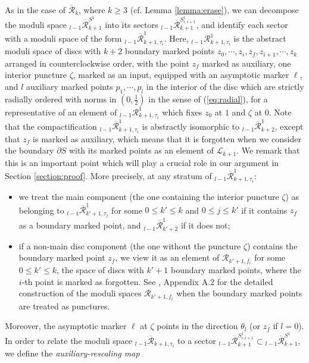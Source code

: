 \documentclass[a4paper]{article}
\numberwithin{equation}{section}
\begin{document}
As in the case of $\overline{\mathcal{R}}_k$, where $k\geq3$ (cf. Lemma \ref{lemma:erase}), we can decompose the moduli space ${}_{l-1}\overline{\mathcal{R}}_{k+1}^{S^1}$ into its sectors ${}_{l-1}\overline{\mathcal{R}}_{k+1}^{S_{i,i+1}^1}$, and identify each sector with a moduli space of the form ${}_{l-1}\overline{\mathcal{R}}_{k+1,\tau_i}^1$. Here, ${}_{l-1}\mathcal{R}_{k+1,\tau_i}^1$ is the abstract moduli space of discs with $k+2$ boundary marked points $z_0,\cdots,z_{i},z_f,z_{i+1},\cdots,z_k$ arranged in counterclockwise order, with the point $z_f$ marked as auxiliary, one interior puncture $\zeta$, marked as an input, equipped with an asymptotic marker $\ell$, and $l$ auxiliary marked points $p_1,\cdots,p_l$ in the interior of the disc which are strictly radially ordered with norms in $(0,\frac{1}{2})$ in the sense of (\ref{eq:radial}), for a representative of an element of ${}_{l-1}\mathcal{R}_{k+1,\tau_i}^1$ which fixes $z_0$ at $1$ and $\zeta$ at $0$. Note that the compactification ${}_{l-1}\overline{\mathcal{R}}_{k+1,\tau_i}^1$ is abstractly isomorphic to ${}_{l-1}\overline{\mathcal{R}}_{k+2}^1$, except that $z_f$ is marked as auxiliary, which means that it is forgotten when we consider the boundary $\partial S$ with its marked points as an element of $\mathcal{L}_{k+1}$. We remark that this is an important point which will play a crucial role in our argument in Section \ref{section:proof}. More precisely, at any stratum of ${}_{l-1}\overline{\mathcal{R}}_{k+1,\tau_i}^1$:
\begin{itemize}
	\item we treat the main component (the one containing the interior puncture $\zeta$) as belonging to ${}_{l-1}\overline{\mathcal{R}}_{k'+1,\tau_j}^1$ for some $0\leq k'\leq k$ and $0\leq j\leq k'$ if it contains $z_f$ as a boundary marked point, and ${}_{l-1}\overline{\mathcal{R}}_{k'+2}^1$ if it does not;
	\item if a non-main disc component (the one without the puncture $\zeta$) contains the boundary marked point $z_f$, we view it as an element of $\mathcal{R}_{k'+1,f_i}$ for some $0\leq k'\leq k$, the space of discs with $k'+1$ boundary marked points, where the $i$-th point is marked as forgotten. See \cite{sg1}, Appendix A.2 for the detailed construction of the moduli spaces $\mathcal{R}_{k'+1,f_i}$ when the boundary marked points are treated as punctures.
\end{itemize}
Moreover, the asymptotic marker $\ell$ at $\zeta$ points in the direction $\theta_l$ (or $z_f$ if $l=0$). In order to relate the moduli space ${}_{l-1}\overline{\mathcal{R}}_{k+1,\tau_i}$ to a sector ${}_{l-1}\overline{\mathcal{R}}_{k+1}^{S_{i,i+1}^1}\subset{}_{l-1}\overline{\mathcal{R}}_{k+1}^{S^1}$, we define the \textit{auxiliary-rescaling map}
\end{document}
